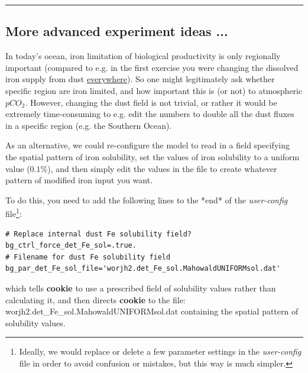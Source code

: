\vspace{1mm} \noindent\rule{4cm}{0.5pt} \vspace{2mm}


\newpage 

\subsection{More advanced experiment ideas ...}

In today's ocean, iron limitation of biological productivity is only regionally important (compared to e.g. in the first exercise you were changing the dissolved iron supply from dust \uline{everywhere}). So one might legitimately ask whether specific region are iron limited, and how important this is (or not) to atmospheric \(pCO_{2}\). However, changing the dust field is not trivial, or rather it would be extremely time-consuming to e.g. edit the numbers to double all the dust fluxes in a specific region (e.g. the Southern Ocean).

\vspace{1mm}
As an alternative, we could re-configure the model to read in a field specifying the spatial pattern of iron solubility, set the values of iron solubility to a uniform value (\(0.1\%\)), and then simply edit the values in the file to create whatever pattern of modified iron input you want.

%
To do this, you need to add the following lines to the *end* of the \textit{user-config} file\footnote{Ideally, we would replace or delete a few parameter settings in the \textit{user-config} file in order to avoid confusion or mistakes, but this way is much simpler.}:

\vspace{-1mm}\small\begin{verbatim}
# Replace internal dust Fe solubility field?
bg_ctrl_force_det_Fe_sol=.true.
# Filename for dust Fe solubility field
bg_par_det_Fe_sol_file='worjh2.det_Fe_sol.MahowaldUNIFORMsol.dat'
\end{verbatim}\normalsize\vspace{-1mm}
which tells \textbf{cookie} to use a prescribed field of solubility values rather than calculating it, and then directs \textbf{cookie} to the file: \textsf{\footnotesize worjh2.det\_Fe\_sol.MahowaldUNIFORMsol.dat} containing the spatial pattern of solubility values.

